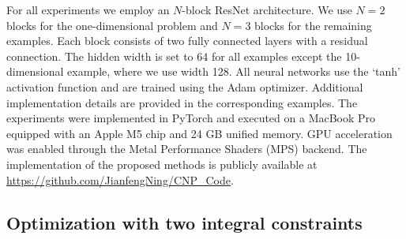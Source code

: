 \documentclass{article}
\numberwithin{equation}{section}
\begin{document}
For all experiments we employ an $N$-block ResNet architecture. We use $N=2$ blocks for the one-dimensional problem and $N=3$ blocks for the remaining examples. Each block consists of two fully connected layers with a residual connection. The hidden width is set to 64 for all examples except the 10-dimensional example, where we use width 128. All neural networks use the `tanh' activation function and are trained using the Adam optimizer. Additional implementation details are provided in the corresponding examples. The experiments were implemented in PyTorch and executed on a MacBook Pro equipped with an Apple M5 chip and 24 GB unified memory. GPU acceleration was enabled through the Metal Performance Shaders (MPS) backend. The implementation of the proposed methods is publicly available at \url{https://github.com/JianfengNing/CNP_Code}.

\subsection{Optimization with two integral constraints}\label{subsec:twointegral}
\end{document}
